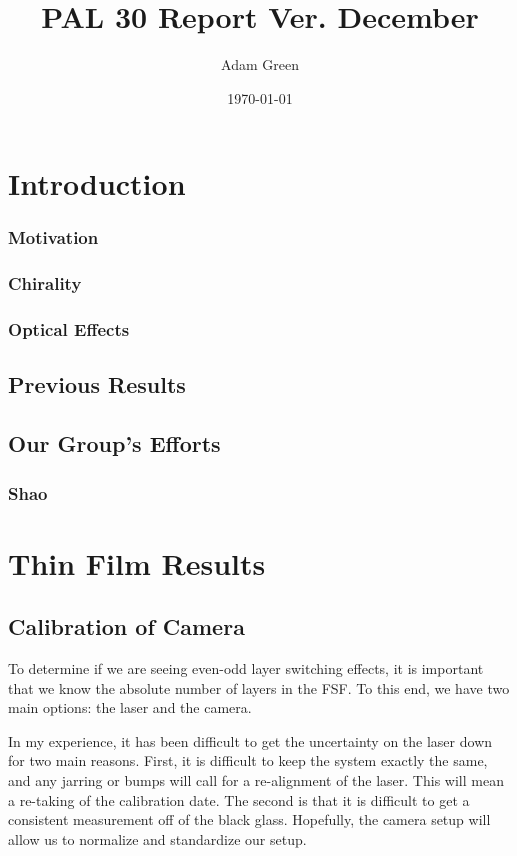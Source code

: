 \documentclass[reprint]{revtex4-1}
\begin{document}
\title{PAL 30 Report Ver. December}
\date{\today}
\author{Adam Green}

\maketitle

\section*{\label{sec:intro} Introduction}
\subsubsection*{Motivation}
\subsubsection*{Chirality}
\subsubsection*{Optical Effects}

\subsection*{Previous Results}

\subsection*{Our Group's Efforts}
\subsubsection*{Shao}
\section*{Thin Film Results}

\subsection*{Calibration of Camera}
To determine if we are seeing even-odd layer switching effects, it is important
that we know the absolute number of layers in the FSF. To this end, we have two
main options: the laser and the camera. 

In my experience, it has been difficult to get the uncertainty on the laser down
for two main reasons. First, it is difficult to keep the system exactly the
same, and any jarring or bumps will call for a re-alignment of the laser. This
will mean a re-taking of the calibration date. The second is that it is
difficult to get a consistent measurement off of the black glass. Hopefully, the
camera setup will allow us to normalize and standardize our setup.
\end{document}
